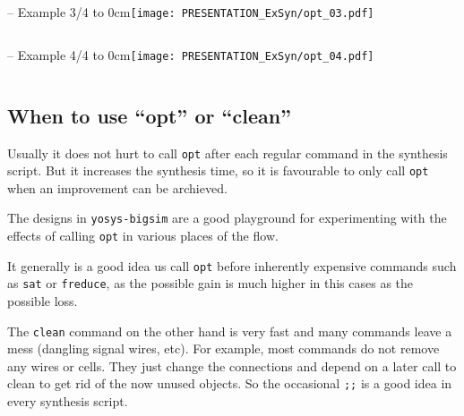 \begin{frame}[t, fragile]{\subsecname{} -- Example 3/4}
\vbox to 0cm{\texttt{[image: PRESENTATION\_ExSyn/opt\_03.pdf]}\vss}
\vskip-1cm
\begin{columns}
\column[t]{5cm}

\column[t]{5cm}

\end{columns}
\end{frame}

\begin{frame}[t, fragile]{\subsecname{} -- Example 4/4}
\vbox to 0cm{\hskip6cm\texttt{[image: PRESENTATION\_ExSyn/opt\_04.pdf]}\vss}
\vskip-1cm
\begin{columns}
\column[t]{5cm}

\column[t]{5cm}

\end{columns}
\end{frame}


\subsection{When to use ``opt'' or ``clean''}

\begin{frame}{\subsecname}
Usually it does not hurt to call {\tt opt} after each regular command in the
synthesis script. But it increases the synthesis time, so it is favourable
to only call {\tt opt} when an improvement can be archieved.

\bigskip
The designs in {\tt yosys-bigsim} are a good playground for experimenting with
the effects of calling {\tt opt} in various places of the flow.

\bigskip
It generally is a good idea us call {\tt opt} before inherently expensive
commands such as {\tt sat} or {\tt freduce}, as the possible gain is much
higher in this cases as the possible loss.

\bigskip
The {\tt clean} command on the other hand is very fast and many commands leave
a mess (dangling signal wires, etc). For example, most commands do not remove
any wires or cells. They just change the connections and depend on a later
call to clean to get rid of the now unused objects. So the occasional {\tt ;;}
is a good idea in every synthesis script.
\end{frame}

